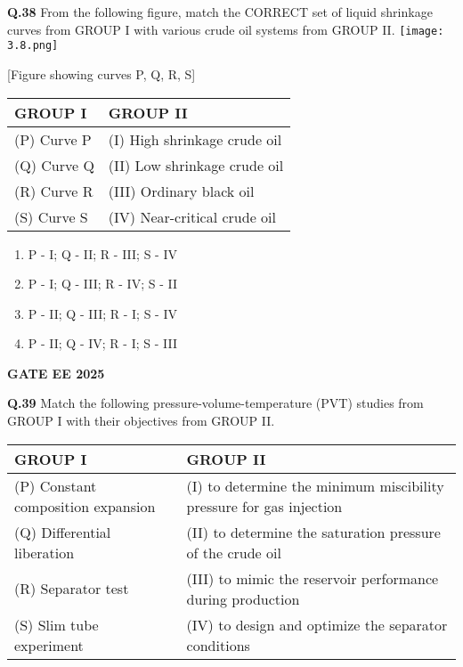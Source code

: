 \documentclass{article}
\begin{document}
\vspace{0.5cm}

\textbf{Q.38} From the following figure, match the CORRECT set of liquid shrinkage curves from GROUP I with various crude oil systems from GROUP II.
\texttt{[image: 3.8.png]}

\begin{center}
[Figure showing curves P, Q, R, S]
\end{center}

\begin{tabular}{|l|l|}
\hline
GROUP I & GROUP II \\
\hline
(P) Curve P & (I) High shrinkage crude oil \\
(Q) Curve Q & (II) Low shrinkage crude oil \\
(R) Curve R & (III) Ordinary black oil \\
(S) Curve S & (IV) Near-critical crude oil \\
\hline
\end{tabular}

\begin{enumerate}[label=(\Alph*)]
    \item P - I; Q - II; R - III; S - IV
    \item P - I; Q - III; R - IV; S - II
    \item P - II; Q - III; R - I; S - IV
    \item P - II; Q - IV; R - I; S - III
\end{enumerate}
\textbf{GATE EE 2025}

\vspace{0.5cm}

\textbf{Q.39} Match the following pressure-volume-temperature (PVT) studies from GROUP I with their objectives from GROUP II.

\begin{tabular}{|l|l|}
\hline
GROUP I & GROUP II \\
\hline
(P) Constant composition expansion & (I) to determine the minimum miscibility pressure for gas injection \\
(Q) Differential liberation & (II) to determine the saturation pressure of the crude oil \\
(R) Separator test & (III) to mimic the reservoir performance during production \\
(S) Slim tube experiment & (IV) to design and optimize the separator conditions \\
\hline
\end{tabular}
\end{document}
